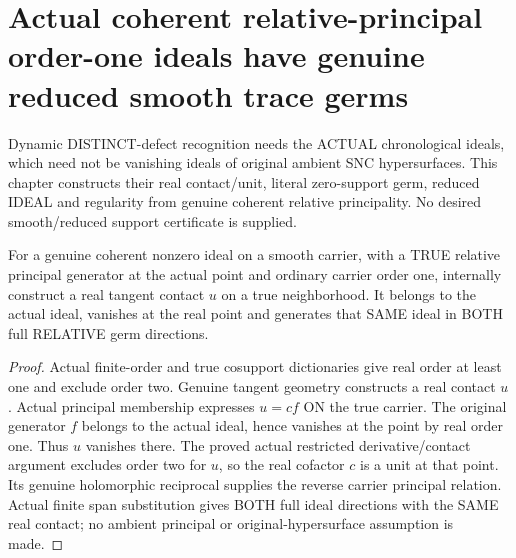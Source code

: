 \section{Actual coherent relative-principal order-one ideals have genuine reduced smooth trace germs}

Dynamic DISTINCT-defect recognition needs the ACTUAL chronological ideals,
which need not be vanishing ideals of original ambient SNC hypersurfaces.
This chapter constructs their real contact/unit, literal zero-support germ,
reduced IDEAL and regularity from genuine coherent relative principality.
No desired smooth/reduced support certificate is supplied.

\begin{theorem}
\label{hir:sharp-actual-relative-principal-order-one-contact}
\leanok
For a genuine coherent nonzero ideal on a smooth carrier, with a TRUE relative
principal generator at the actual point and ordinary carrier order one,
internally construct a real tangent contact $u$ on a true neighborhood.
It belongs to the actual ideal, vanishes at the real point and generates
that SAME ideal in BOTH full RELATIVE germ directions.
\end{theorem}
\begin{proof}
Actual finite-order and true cosupport dictionaries give real order at least
one and exclude order two. Genuine tangent geometry constructs a real contact
$u$. Actual principal membership expresses $u=c f$ ON the true carrier.
The original generator $f$ belongs to the actual ideal, hence vanishes at
the point by real order one. Thus $u$ vanishes there. The proved actual
restricted derivative/contact argument excludes order two for $u$, so the
real cofactor $c$ is a unit at that point. Its genuine holomorphic reciprocal
supplies the reverse carrier principal relation. Actual finite span
substitution gives BOTH full ideal directions with the SAME real contact;
no ambient principal or original-hypersurface assumption is made.
\end{proof}


